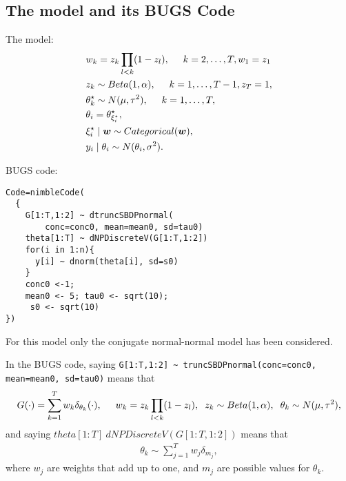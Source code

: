 \documentclass[12pt]{article}
\begin{document}
\subsection{The model and its BUGS Code}
\begin{minipage}{.5\textwidth}
The model:
\begin{align*}
&w_k=z_k\prod_{l<k}(1-z_l), \hspace{0.5cm} k=2, \ldots, T, w_1=z_1\\
&z_k \sim Beta(1, \alpha), \hspace{0.5cm} k=1, \ldots, T-1, z_T=1, \\
&\theta^{\star}_k  \sim N(\mu, \tau^2), \hspace{0.5cm}k=1, \ldots, T,\\
&\theta_i= \theta^{\star}_{\xi_i^{\star}},\\
&\xi_i^{\star}\mid \boldsymbol{w} \sim Categorical(\boldsymbol{w}),\\
&y_i\mid \theta_i \sim N(\theta_i, \sigma^2).\\
\end{align*} 
\end{minipage}
\begin{minipage}{.5\textwidth}
BUGS code:
\begin{verbatim}
Code=nimbleCode(
  {
    G[1:T,1:2] ~ dtruncSBDPnormal(
        conc=conc0, mean=mean0, sd=tau0)
    theta[1:T] ~ dNPDiscreteV(G[1:T,1:2])
    for(i in 1:n){
      y[i] ~ dnorm(theta[i], sd=s0)
    }
    conc0 <-1;
    mean0 <- 5; tau0 <- sqrt(10);
     s0 <- sqrt(10)
})
\end{verbatim}
\end{minipage}
\vspace{0.5cm}

For this  model only the conjugate normal-normal model has been considered. 

In the BUGS code, saying \texttt{G[1:T,1:2] \~{} truncSBDPnormal(conc=conc0, mean=mean0, sd=tau0)} means that 
 \begin{align*}
 G(\cdot)=\sum_{k=1}^T w_k \delta_{\theta_k}(\cdot), \hspace{0.5cm}w_k=z_k\prod_{l<k}(1-z_l), \hspace{0.2cm}z_k \sim Beta(1, \alpha), \hspace{0.2cm} \theta_k  \sim N(\mu, \tau^2),
 \end{align*}
  and saying $theta[1:T] ~ dNPDiscreteV(G[1:T,1:2])$ means that 
 \begin{align*}
 \theta_k\sim \sum_{j=1}^T w_j \delta_{m_j},
 \end{align*}
 where $w_j$ are weights that add up to one, and $m_j$ are possible values for $\theta_k$.
\end{document}
